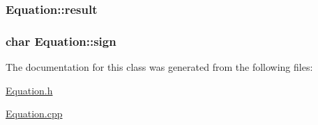 \subsubsection[{\texorpdfstring{result}{result}}]{ Equation\+::result\hspace{0.3cm}{\ttfamily [private]}}\hypertarget{classEquation_a7696f7ad262ed21259b3fd3d2d628549}{}\label{classEquation_a7696f7ad262ed21259b3fd3d2d628549}
\subsubsection[{\texorpdfstring{sign}{sign}}]{\setlength{\rightskip}{0pt plus 5cm}char Equation\+::sign\hspace{0.3cm}{\ttfamily [private]}}\hypertarget{classEquation_a4d9ef234f54586c639efa69d7e958760}{}\label{classEquation_a4d9ef234f54586c639efa69d7e958760}


The documentation for this class was generated from the following files\+:\begin{DoxyCompactItemize}
\item 
\hyperlink{Equation_8h}{Equation.\+h}\item 
\hyperlink{Equation_8cpp}{Equation.\+cpp}\end{DoxyCompactItemize}

